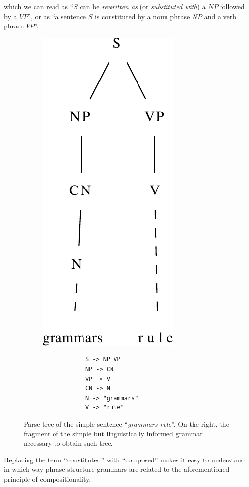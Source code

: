 which we can read as ``$S$ can be \textit{rewritten as} (or \textit{substituted with}) a $\mathit{NP}$ followed by a $\mathit{VP}$'', or as ``a sentence $S$ is constituted by a noun phrase $\mathit{NP}$ and a verb phrase $\mathit{VP}$''. \smallskip

\begin{figure}[h]
    \centering
    \begin{subfigure}{.35\textwidth}
      \centering
      \includegraphics[width=.4\linewidth]{figure/parsetree.pdf}
    \end{subfigure}%
    \begin{subfigure}{.6\textwidth}
        \centering
        \begin{lstlisting}
            S -> NP VP
            NP -> CN
            VP -> V
            CN -> N
            N -> "grammars"
            V -> "rule"
        \end{lstlisting}
    \end{subfigure}
    \caption[Parse tree of the sentence ``\textit{grammars rule}'' and corresponding grammar fragment]{Parse tree of the simple sentence ``\textit{grammars rule}''. On the right, the fragment of the simple but linguistically informed grammar necessary to obtain such tree.}
    \label{pt}
\end{figure}

Replacing the term ``constituted'' with ``composed'' makes it easy to understand in which way phrase structure grammars are related to the aforementioned principle of compositionality. \smallskip

